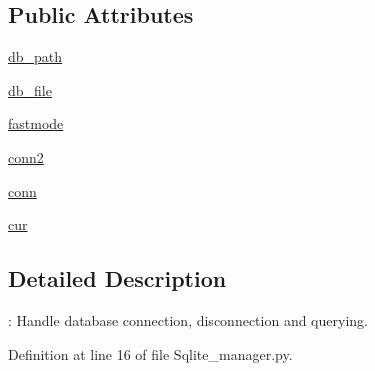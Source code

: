 \subsection*{\-Public \-Attributes}
\begin{DoxyCompactItemize}
\item 
\hyperlink{classirna_1_1David2tulip_1_1Sqlite__manager_1_1Sqlite__manager_aaf3093f83fe837954b733f5d24783298}{db\-\_\-path}
\item 
\hyperlink{classirna_1_1David2tulip_1_1Sqlite__manager_1_1Sqlite__manager_a866f81627e0b8e462ed0f3eecde6e97f}{db\-\_\-file}
\item 
\hyperlink{classirna_1_1David2tulip_1_1Sqlite__manager_1_1Sqlite__manager_ae9aa2f3e8a0e6df55e14a6e275b07d9f}{fastmode}
\item 
\hyperlink{classirna_1_1David2tulip_1_1Sqlite__manager_1_1Sqlite__manager_a682dfb2f9b72bd08d421969da09be46e}{conn2}
\item 
\hyperlink{classirna_1_1David2tulip_1_1Sqlite__manager_1_1Sqlite__manager_a22f0a340297bcf1c7e711374b24b9b20}{conn}
\item 
\hyperlink{classirna_1_1David2tulip_1_1Sqlite__manager_1_1Sqlite__manager_a65ec812a84daa123c5fd8bfb841b8c6d}{cur}
\end{DoxyCompactItemize}


\subsection{\-Detailed \-Description}
\-: \-Handle database connection, disconnection and querying. 

\-Definition at line 16 of file \-Sqlite\-\_\-manager.\-py.



